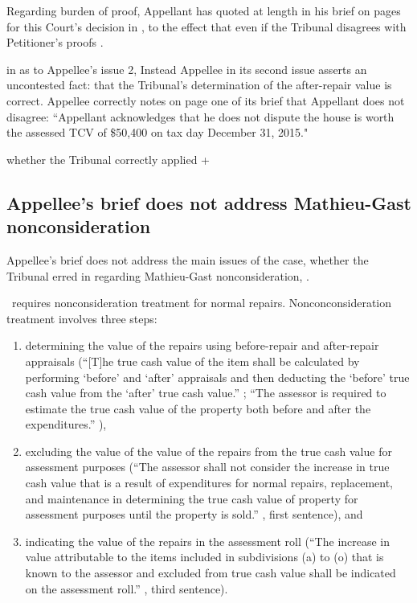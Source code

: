 \documentclass[12pt,\documentclassflag]{michiganCourtOfAppealsBrief}
\begin{document}
Regarding burden of proof, Appellant has quoted at length in his brief on pages for this Court's decision in , to the effect that even if the Tribunal disagrees with Petitioner's proofs
.


in as to Appellee's issue 2, 
Instead Appellee in its second issue asserts an uncontested fact: that the Tribunal's determination of the after-repair value is correct. Appellee correctly notes on page one of its brief that Appellant does not disagree: ``Appellant acknowledges that he does not dispute the house is worth the assessed TCV of \$50,400 on tax day December 31, 2015."



whether the Tribunal correctly applied +




\subsection{Appellee's brief does not address Mathieu-Gast nonconsideration}

Appellee's brief does not address the main issues of the case, whether the Tribunal erred in regarding Mathieu-Gast nonconsideration, \mathieuGast.

\mathieuGast\ requires nonconsideration treatment for normal repairs. Nonconconsideration treatment involves three steps:
\begin{enumerate}
\item determining the value of the repairs using before-repair and after-repair appraisals (``[T]he true cash value of the item shall be calculated by performing `before' and `after' appraisals and then deducting the `before' true cash value from the `after' true cash value.'' ; ``The assessor is required to estimate the true cash value of the property both before and after the expenditures.'' \stcform[2]),

\item excluding the value of the value of the repairs from the true cash value for assessment purposes (``The assessor shall not consider the increase in true cash value that is a result of expenditures for normal repairs, replacement, and maintenance in determining the true cash value of property for assessment purposes until the property is sold.'' \mathieuGast, first sentence), and

\item indicating the value of the repairs in the assessment roll (``The increase in value attributable to the items included in subdivisions (a) to (o) that is known to the assessor and excluded from true cash value shall be indicated on the assessment roll.'' \mathieuGast, third sentence).
\end{enumerate}
\end{document}
